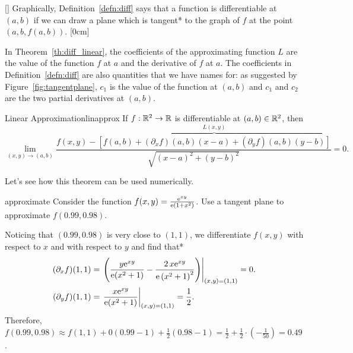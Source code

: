 \documentclass[prettycode,shellescape]{watsonbook}
\begin{document}
\begin{insetfigure}{\usebox{\asybox}}[]
Graphically, Definition~\ref{defn:diff} says that a function is differentiable at $(a,b)$ if we can draw a plane which is tangent* to the graph of $f$ at the point $(a,b,f(a,b))$. [0cm]

In Theorem~\ref{th:diff_linear}, the coefficients of the approximating
function $L$ are the value of the function $f$ at $a$ and the
derivative of $f$ at $a$. The coefficients in
Definition~\ref{defn:diff} are also quantities that we have names for:
as suggested by Figure~\ref{fig:tangentplane}, $c_1$ is the value of
the function at $(a,b)$ and $c_1$ and $c_2$ are the two partial
derivatives at $(a,b)$.
\end{insetfigure}

\vspace{12pt} 

\begin{theo}{Linear Approximation}{linapprox}
  If $f: \mathbb{R}^2 \to \mathbb{R}$ is differentiable at $(a,b) \in \mathbb{R}^2$, then
  \[
    \lim_{(x,y) \to (a,b)}\frac{f(x,y) - \overbrace{\left[f(a,b) + (\partial_x
          f)(a,b)(x-a) + (\partial_y
          f)(a,b)(y-b)\right]}^{L(x,y)}}{\sqrt{(x-a)^2 + (y-b)^2}} = 0.
  \]
\end{theo} \bang{-2cm} 

Let's see how this theorem can be used numerically. 

\begin{example}{}{approximate}
  Consider the function $f(x,y) = \frac{\mathrm{e}^{xy}}{\mathrm{e}(1+x^2)}$. Use a
  tangent plane to approximate $f(0.99,0.98)$.
\end{example}

\begin{solution}
  Noticing that $(0.99,0.98)$ is very close to $(1,1)$, we
  differentiate $f(x,y)$ with respect to $x$ and with respect to $y$ and
  find that* 
  \begin{align*}
    (\partial_x f)(1,1) &= \left.\left(
                          \frac{y \mathrm{e}^{x y}}{\mathrm{e}(x^{2} + 1)} -
                          \frac{2 \, x \mathrm{e}^{xy}}{{\mathrm{e}\left(x^{2} +
                          1\right)}^{2}}\right)\right|_{(x,y)
                          =(1,1)} = 0. \\
    (\partial_y f)(1,1) &=    \left.\frac{x \mathrm{e}^{x y}}{\mathrm{e}(x^{2} +
                          1)}\right|_{(x,y) = (1,1)} = \frac{1}{2}. 
  \end{align*}
  Therefore, $f(0.99,0.98) \approx f(1,1) + 0(0.99-1) +
  \frac{1}{2}(0.98-1) = \frac{1}{2} + \frac{1}{2} \cdot
  (-\frac{1}{50}) = 0.49$.  
\end{solution}
\end{document}
